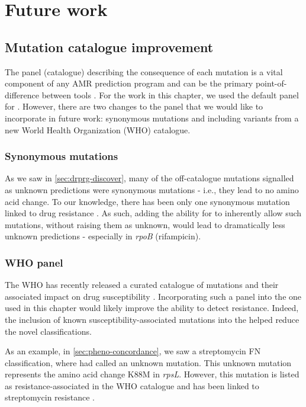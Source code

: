 \section{Future work}

\subsection{Mutation catalogue improvement}

The panel (catalogue) describing the consequence of each mutation is a vital component of any AMR prediction program and can be the primary point-of-difference between tools \cite{hunt2019}. For the work in this chapter, we used the default \mykrobe{} panel for \drprg{}. However, there are two changes to the \drprg{} panel that we would like to incorporate in future work: synonymous mutations and including variants from a new World Health Organization (WHO) catalogue.

\subsubsection{Synonymous mutations}

As we saw in \autoref{sec:drprg-discover}, many of the off-catalogue mutations signalled as unknown predictions were synonymous mutations - i.e., they lead to no amino acid change. To our knowledge, there has been only one synonymous mutation linked to \mtb{} drug resistance \cite{Ando2014}. As such, adding the ability for \drprg{} to inherently allow such mutations, without raising them as unknown, would lead to dramatically less unknown predictions - especially in \textit{rpoB} (rifampicin).

\subsubsection{WHO panel}

The WHO has recently released a curated catalogue of \mtb{} mutations and their associated impact on drug susceptibility \cite{whopanel2021}. Incorporating such a panel into the one used in this chapter would likely improve the ability to detect resistance. Indeed, the inclusion of known susceptibility-associated mutations into the \drprg{} helped reduce the novel classifications.

As an example, in \autoref{sec:pheno-concordance}, we saw a streptomycin FN classification, where \drprg{} had called an unknown mutation. This unknown mutation represents the amino acid change K88M in \textit{rpsL}. However, this mutation is listed as resistance-associated in the WHO catalogue and has been linked to streptomycin resistance \cite{Smittipat2016}.

